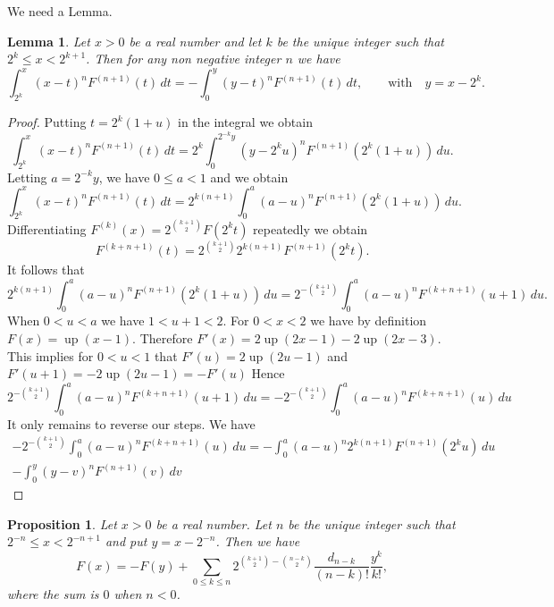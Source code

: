 \documentclass[10pt]{amsart}
\newtheorem{prop}[thm]{Proposition}
\newtheorem{lem}{Lemma}
\theoremstyle{definition}
\theoremstyle{remark}
\DeclareMathOperator\up{up}
\begin{document}
We need a Lemma.
\begin{lem}\label{L:taylor}
Let $x>0$ be a real number and let  $k$ be the unique integer such that $2^k\le x<2^{k+1}$. Then for any 
non negative integer $n$ we have
\begin{equation}
\int_{2^k}^x(x-t)^nF^{(n+1)}(t)\,dt=-\int_0^{y}(y-t)^n F^{(n+1)}(t)\,dt,\qquad \text{with}\quad y=x-2^k.
\end{equation}
\end{lem}

\begin{proof}
Putting $t=2^k(1+u)$ in the integral we obtain
\[\int_{2^k}^x(x-t)^nF^{(n+1)}(t)\,dt=2^k\int_{0}^{2^{-k}y}(y-2^k u)^nF^{(n+1)}(2^k(1+u))\,du.\]
Letting $a=2^{-k}y$, we have $0\le a<1$  and we obtain
\[\int_{2^k}^x(x-t)^nF^{(n+1)}(t)\,dt=2^{k(n+1)}\int_{0}^{a}(a-u)^nF^{(n+1)}(2^k(1+u))\,du.\]
Differentiating $F^{(k)}(x)=2^{\binom{k+1}{2}}F(2^k t)$ repeatedly we obtain
\[F^{(k+n+1)}(t)=2^{\binom{k+1}{2}} 2^{k(n+1)}F^{(n+1)}(2^k t).\]
It follows that 
\[2^{k(n+1)}\int_{0}^{a}(a-u)^nF^{(n+1)}(2^k(1+u))\,du=2^{-\binom{k+1}{2}}\int_{0}^{a}(a-u)^nF^{(k+n+1)}(u+1)\,du.\]
When $0<u<a$ we have $1<u+1<2$. For $0<x<2$ we have by definition $F(x)=\up(x-1)$. 
Therefore $F'(x)=2\up(2x-1)-2\up(2x-3)$. This implies for $0<u<1$ that $F'(u)=2\up(2u-1)$ and $F'(u+1)=-2\up(2u-1)=-F'(u)$
Hence
\[2^{-\binom{k+1}{2}}\int_{0}^{a}(a-u)^nF^{(k+n+1)}(u+1)\,du=-2^{-\binom{k+1}{2}}\int_{0}^{a}(a-u)^nF^{(k+n+1)}(u)\,du\]
It only remains to reverse our steps.  We have
\begin{multline*}
-2^{-\binom{k+1}{2}}\int_{0}^{a}(a-u)^nF^{(k+n+1)}(u)\,du=
-\int_{0}^{a}(a-u)^n 2^{k(n+1)}F^{(n+1)}(2^k u)\,du
\\
-\int_{0}^{y}(y-v)^n F^{(n+1)}(v)\,dv
\end{multline*}

\end{proof}


\begin{prop}\label{P:Res}
Let $x>0$ be a real number. Let  $n$ be the unique integer  such that $2^{-n}\le x< 2^{-n+1}$ and put $y=x-2^{-n}$.
Then we have 
\begin{equation}
F(x)=-F(y)+\sum_{0\le k\le n} 2^{\binom{k+1}{2}-\binom{n-k}{2}}\frac{d_{n-k}}{(n-k)!}\frac{y^k}{k!},
\end{equation}
where the sum is $0$ when $n<0$. 
\end{prop}
\end{document}

